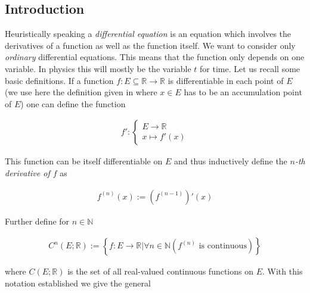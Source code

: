 \subsection{Introduction}
Heuristically speaking a \emph{differential equation} is an equation which involves the derivatives of a function as well as the function itself. We want to consider only \emph{ordinary} differential equations. This means that the function only depends on one variable. In physics this will mostly be the variable $t$ for time. Let us recall some basic definitions. If a function $f: E \subseteq \mathbb{R} \rightarrow \mathbb{R}$ is differentiable in each point of $E$ (we use here the definition given in \cite[186--187]{Analysis_I_ZORICH} where $x \in E$ has to be an accumulation point of $E$) one can define the function

\begin{gather}
	f': \begin{cases}
		E \longrightarrow \mathbb{R}\\
		x \longmapsto f'(x)
	\end{cases}
\end{gather}

This function can be itself differentiable on $E$ and thus inductively define the \emph{$n$-th derivative of $f$} as 

\begin{gather}
	\boxed{f^{(n)}(x) := \left( f^{(n-1)} \right)'(x)}
\end{gather}

Further define for $n \in \mathbb{N}$

\begin{gather}
	C^n(E;\mathbb{R}) := \left\{ f: E \rightarrow \mathbb{R} \big\vert \forall n \in \mathbb{N}\left(f^{(n)} \text{ is continuous}\right)\right\}
\end{gather}

where $C(E;\mathbb{R})$ is the set of all real-valued continuous functions on $E$. With this notation established we give the general

